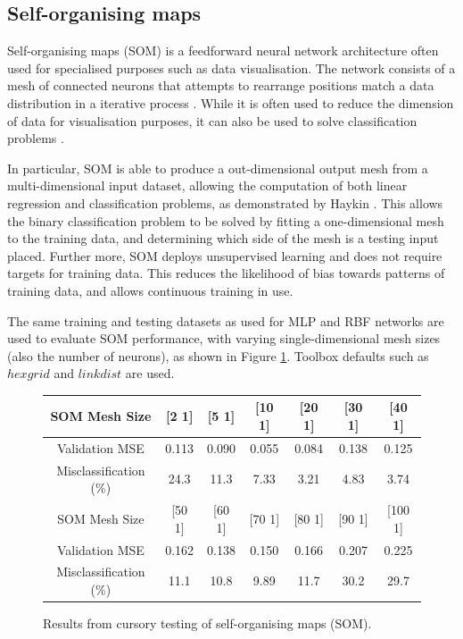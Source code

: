 \documentclass[10pt, oneside]{article}
\begin{document}
\subsection{Self-organising maps} \label{subsec:som-test}

Self-organising maps (SOM) is a feedforward neural network architecture often used for specialised purposes such as data visualisation. The network consists of a mesh of connected neurons that attempts to rearrange positions match a data distribution in a iterative process \cite[p. 34]{som-lecture}. While it is often used to reduce the dimension of data for visualisation purposes, it can also be used to solve classification problems \cite{owens2000application}. 

In particular, SOM is able to produce a out-dimensional output mesh from a multi-dimensional input dataset, allowing the computation of both linear regression and classification problems, as demonstrated by Haykin \cite[Sec. 9.5]{haykin2008}. This allows the binary classification problem to be solved by fitting a one-dimensional mesh to the training data, and determining which side of the mesh is a testing input placed. Further more, SOM deploys unsupervised learning and does not require targets for training data. This reduces the likelihood of bias towards patterns of training data, and allows continuous training in use.

The same training and testing datasets as used for MLP and RBF networks are used to evaluate SOM performance, with varying single-dimensional mesh sizes (also the number of neurons), as shown in Figure \ref{fig:som-testing}. Toolbox defaults such as $hexgrid$ and $linkdist$ are used.

\begin{figure}[h]
\begin{center}
\fontsize{9}{11}\selectfont
\begin{tabular}{|c|c|c|c|c|c|c|}
\hline 
SOM Mesh Size & [2 1] & [5 1] & [10 1] & [20 1] & [30 1] & [40 1] \\ \hline 
Validation MSE & 0.113 & 0.090 & 0.055 & 0.084 & 0.138 & 0.125 \\ \hline 
Misclassification (\%) & 24.3 & 11.3 & 7.33 & 3.21 & 4.83 & 3.74 \\ \hline \hline 
SOM Mesh Size & [50 1] & [60 1] & [70 1] & [80 1] & [90 1] & [100 1] \\ \hline 
Validation MSE & 0.162 & 0.138 & 0.150 & 0.166 & 0.207 & 0.225 \\ \hline 
Misclassification (\%) & 11.1 & 10.8 & 9.89 & 11.7 & 30.2 & 29.7 \\ \hline 
\end{tabular}
\end{center}
\caption{\label{fig:som-testing} Results from cursory testing of self-organising maps (SOM).}
\end{figure}
\end{document}
